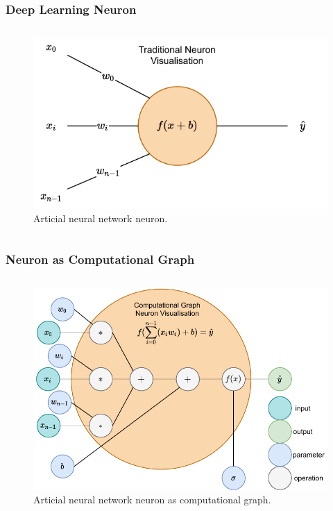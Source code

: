 \documentclass[aspectratio=169]{beamer}
\begin{document}
  \begin{frame}
    \frametitle{Deep Learning Neuron}
    \begin{columns}
      \begin{column}{0.5\textwidth}
        \begin{figure}[th!]
          \centering
          \includegraphics[width=1\textwidth]{neuron.pdf}
          \caption{Articial neural network neuron. \autocite{repository}}
          \label{fig:neuron}
        \end{figure}
      \end{column}
    \end{columns}
  \end{frame}

  \begin{frame}
    \frametitle{Neuron as Computational Graph}
    \begin{columns}
      \begin{column}{0.5\textwidth}
        \begin{figure}[th!]
          \centering
          \includegraphics[width=1\textwidth]{neuron_computational_graph.pdf}
          \caption{Articial neural network neuron as computational graph. \autocite{repository}}
          \label{fig:neuron}
        \end{figure}
      \end{column}
    \end{columns}
  \end{frame}
\end{document}
